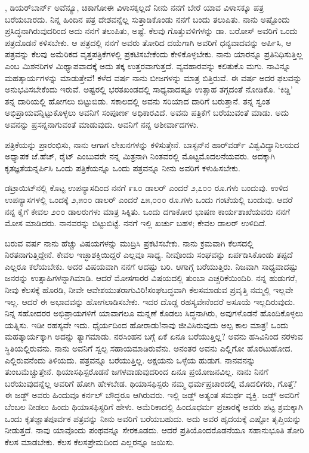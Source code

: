 , ಡಿಯರ್‌ಬಾರ್ನ್ ಅವೆನ್ಯೂ, ಚಿಕಾಗೋ\enginline{-}ಈ ವಿಳಾಸಕ್ಕಲ್ಲದೆ ನೀನು ನನಗೆ ಬೇರೆ ಯಾವ ವಿಳಾಸಕ್ಕೂ ಪತ್ರ ಬರೆಯಬಾರದು. ನಿನ್ನ ಹಿಂದಿನ ಪತ್ರ ದೇಶವನ್ನೆಲ್ಲ ಸುತ್ತಾಡಿಕೊಂಡು ನನಗೆ ಬಂದು ತಲುಪಿತು. ನಾನು ಅಷ್ಟೊಂದು ಪ್ರಸಿದ್ಧನಾಗಿರುವುದರಿಂದ ಅದು ನನಗೆ ತಲುಪಿತು, ಅಷ್ಟೆ. ಕೆಲವು ಗೊತ್ತುವಳಿಗಳನ್ನು ಡಾ. ಬರೋಸ್ ಅವರಿಗೆ ಒಂದು ಪತ್ರದೊಡನೆ ಕಳಿಸಬೇಕು. ಆ ಪತ್ರದಲ್ಲಿ ನನಗೆ ಅವರು ತೋರಿದ ದಯೆಗಾಗಿ ಅವರಿಗೆ ಧನ್ಯವಾದವನ್ನು ಅರ್ಪಿಸಿ, ಆ ಪತ್ರವನ್ನು ಕೆಲವು ಅಮೆರಿಕದ ವೃತ್ತಪತ್ರಿಕೆಗಳಲ್ಲಿ ಪ್ರಕಟಿಸಬೇಕೆಂದು ಕೇಳಿಕೊಳ್ಳಬೇಕು. ನಾನು ಯಾರನ್ನೂ ಪ್ರತಿನಿಧಿಸುತ್ತಿಲ್ಲ ಎಂಬ ಮಿಶನರಿಗಳ ಮಿಥ್ಯಾಪವಾದಕ್ಕೆ ಅದು ತಕ್ಕ ಉತ್ತರವಾಗುತ್ತದೆ. ವ್ಯವಹಾರವನ್ನು ಕಲಿತುಕೊ ಮಗು. ನಾವಿನ್ನೂ ಮಹತ್ಕಾರ್ಯಗಳನ್ನು ಮಾಡುತ್ತೇವೆ! ಕಳೆದ ವರ್ಷ ನಾನು ಬೀಜಗಳನ್ನು ಮಾತ್ರ ಬಿತ್ತಿರುವೆ. ಈ ವರ್ಷ ಅದರ ಫಲವನ್ನು ಅನುಭವಿಸಬೇಕೆಂದು ಇರುವೆ. ಅಷ್ಟರಲ್ಲಿ ಭರತಖಂಡದಲ್ಲಿ ಸಾಧ್ಯವಾದಷ್ಟೂ ಉತ್ಸಾಹ ತಗ್ಗದಂತೆ ನೋಡಿಕೊ. `ಕಿಡ್ಡಿ' ತನ್ನ ದಾರಿಯಲ್ಲಿ ಹೋಗಲು ಬಿಟ್ಟುಬಿಡು. ಸಕಾಲದಲ್ಲಿ ಅವನು ಸರಿಯಾದ ದಾರಿಗೆ ಬರುತ್ತಾನೆ. ತನ್ನ ಸ್ವಂತ ಅಭಿಪ್ರಾಯವನ್ನಿಟ್ಟುಕೊಳ್ಳಲು ಅವನಿಗೆ ಸಂಪೂರ್ಣ ಅಧಿಕಾರವಿದೆ. ಅವನು ಪತ್ರಿಕೆಗೆ ಬರೆಯುವಂತೆ ಮಾಡು. ಅದು ಅವನನ್ನು ಪ್ರಸನ್ನನಾಗುವಂತೆ ಮಾಡುವುದು. ಅವನಿಗೆ ನನ್ನ ಆಶೀರ್ವಾದಗಳು.

ಪತ್ರಿಕೆಯನ್ನು ಪ್ರಾರಂಭಿಸು, ನಾನು ಆಗಾಗ ಲೇಖನಗಳನ್ನು ಕಳಿಸುತ್ತೇನೆ. ಬಾಸ್ಟನ್‌ನ ಹಾರ್‌ವರ್ಡ್ ವಿಶ್ವವಿದ್ಯಾನಿಲಯದ ಅಧ್ಯಾಪಕ ಜೆ.ಹೆಚ್, ರೈಟ್ ಎಂಬುವರೇ ನನ್ನ ಮಿತ್ರನಾಗಿ ನಿಂತವರಲ್ಲಿ ಮೊಟ್ಟಮೊದಲನೆಯವರು. ಅದಕ್ಕಾಗಿ ಕೃತಜ್ಞತೆಯನ್ನರ್ಪಿಸಿ ಒಂದು ಪತ್ರಿಕೆಯನ್ನೂ ಒಂದು ಪತ್ರವನ್ನೂ ನೀನು ಅವರಿಗೆ ಕಳುಹಿಸಬೇಕು.

ಡಟ್ರಾಯಿಟ್‌ನಲ್ಲಿ ಕೊಟ್ಟ ಉಪನ್ಯಾಸದಿಂದ ನನಗೆ ೯೩೦ ಡಾಲರ್ ಎಂದರೆ ೨,೭೦೦ ರೂ.ಗಳು ಬಂದುವು. ಉಳಿದ ಉಪನ್ಯಾಸಗಳಲ್ಲಿ ಒಂದಕ್ಕೆ ೨,೫೦೦ ಡಾಲರ್ ಎಂದರೆ ೭೫,೦೦೦ ರೂ.ಗಳು ಒಂದು ಗಂಟೆಯಲ್ಲಿ ಬಂದುವು. ಆದರೆ ನನ್ನ ಕೈಗೆ ಕೇವಲ ೨೦೦ ಡಾಲರುಗಳು ಮಾತ್ರ ಸಿಕ್ಕಿತು. ಒಂದು ದಗಾಕೋರ ಭಾಷಣ ಕಾರ್ಯಶಾಖೆಯವರು ನನಗೆ ಮೋಸ ಮಾಡಿದರು. ನಾನವರನ್ನು ಬಿಟ್ಟುಬಿಟ್ಟೆ. ನನಗೆ ಇಲ್ಲಿ ಖರ್ಚು ಬಹಳ; ಕೇವಲ  ಡಾಲರ್‌ ಉಳಿದಿದೆ.

ಬರುವ ವರ್ಷ ನಾನು ಹೆಚ್ಚು ವಿಷಯಗಳನ್ನು ಮುದ್ರಿಸಿ ಪ್ರಕಟಿಸಬೇಕು. ನಾನು ಕ್ರಮವಾಗಿ ಕೆಲಸದಲ್ಲಿ ನಿರತನಾಗುತ್ತಿದ್ದೇನೆ. ಕೇವಲ ಇಚ್ಛಾಶಕ್ತಿಯಿದ್ದರೆ ಎಲ್ಲವೂ ಸಾಧ್ಯ. ನೀವೊಂದು ಸಂಘವನ್ನು ಏರ್ಪಡಿಸಿಕೊಂಡು ತಪ್ಪದೆ ಎಲ್ಲರೂ ಕಲೆಯಬೇಕು. ಅದರ ವಿಷಯವಾಗಿ ನನಗೆ ಆದಷ್ಟು ಬರಿ. ಆಗಾಗ್ಗೆ ಬರೆಯುತ್ತಿರು. ನಿಜವಾಗಿ ಸಾಧ್ಯವಾದಷ್ಟು ಜನರನ್ನು ಉತ್ಸಾಹಿಗಳನ್ನಾಗಿಮಾಡಿ. ಆದರೆ ಮೋಸಗಾರರ ವಿಷಯದಲ್ಲಿ ತುಂಬಾ ಎಚ್ಚರಿಕೆಯಿಂದಿರಿ. ನನ್ನ ಹುಡುಗರೆ, ನೀವು ಕೆಲಸಕ್ಕೆ ಹೊರಡಿ, ನೀವೇ ಆವೇಶಯುತರಾಗುವಿರಿ!ಸಂಘಬದ್ಧವಾಗಿ ಕೆಲಸಮಾಡುವ ಪ್ರವೃತ್ತಿ ನಮ್ಮಲ್ಲಿ ಇಲ್ಲವೇ ಇಲ್ಲ. ಆದರೆ ಈ ಅಭಾವವನ್ನು ಹೋಗಲಾಡಿಸಬೇಕು. ಇದರ ದೊಡ್ಡ ರಹಸ್ಯವೇನೆಂದರೆ ಅಸೂಯೆ ಇಲ್ಲದಿರುವುದು. ನಿನ್ನ ಸಹೋದರರ ಅಭಿಪ್ರಾಯಗಳಿಗೆ ಯಾವಾಗಲೂ ಮನ್ನಣೆ ಕೊಡಲು ಸಿದ್ಧನಾಗಿರು, ಅವುಗಳೊಡನೆ ಹೊಂದಿಕೊಳ್ಳಲು ಯತ್ನಿಸು. ಇಡೀ ರಹಸ್ಯವೇ ಇದು. ಧೈರ್ಯದಿಂದ ಹೋರಾಡು!ನಾವು ಜೀವಿಸಿರುವುದು ಅಲ್ಪ ಕಾಲ ಮಾತ್ರ! ಒಂದು ಮಹತ್ಕಾರ್ಯಕ್ಕಾಗಿ ಅದನ್ನು ತ್ಯಾಗಮಾಡು. ನರಸಿಂಹನ ಬಗ್ಗೆ ಏಕೆ ಏನೂ ಬರೆಯುತ್ತಿಲ್ಲ? ಅವನು ಹಸಿವಿನಿಂದ ನರಳುವ ಸ್ಥಿತಿಯಲ್ಲಿರುವನು. ನಾನು ಅವನಿಗೆ ಸ್ವಲ್ಪ ಸಹಾಯಮಾಡಿರುವೆನು. ಅನಂತರ ಅವನು ಎಲ್ಲಿಗೋ ಹೊರಟುಹೋದ. ಎಲ್ಲಿರುವನೆಂದು ತಿಳಿಯದು. ಪತ್ರವನ್ನೂ ಬರೆಯುತ್ತಿಲ್ಲ. ಅಕ್ಷಯನು ಒಳ್ಳೆಯ ಹುಡುಗ. ನಾನವನನ್ನು ತುಂಬಮೆಚ್ಚುತ್ತೇನೆ. ಥಿಯಾಸಫಿಸ್ಟರೊಡನೆ ಜಗಳವಾಡುವುದರಿಂದ ಏನೂ ಪ್ರಯೋಜನವಿಲ್ಲ. ನಾನು ನಿನಗೆ ಬರೆಯುವುದನ್ನೆಲ್ಲ ಅವರಿಗೆ ಹೋಗಿ ಹೇಳಬೇಡ. ಥಿಯಾಸಫಿಸ್ಟರು ನಮ್ಮ ಧರ್ಮಪ್ರಚಾರದಲ್ಲಿ ಮೊದಲಿಗರು, ಗೊತ್ತೆ? ಈ ಜಡ್ಜ್ ಅವರು ಹಿಂದುವೂ ಕರ್ನಲ್ ಬೌದ್ಧರೂ ಆಗಿರುವರು. ಇಲ್ಲಿ ಜಡ್ಜ್ ಅತ್ಯಂತ ಸಮರ್ಥ ವ್ಯಕ್ತಿ. ಜಡ್ಜ್ ಅವರಿಗೆ ಬೆಂಬಲ ನೀಡಲು ಹಿಂದು ಥಿಯಾಸಫಿಸ್ಟರಿಗೆ ಹೇಳು. ಅಮೆರಿಕಾದಲ್ಲಿ ಹಿಂದೂಧರ್ಮ ಪ್ರಚಾರಕ್ಕೆ ಅವರು ಪಟ್ಟ ಶ್ರಮಕ್ಕಾಗಿ ಒಂದು ಕೃತಜ್ಞಾತಪೂರ್ವಕ ಪತ್ರವನ್ನು ನೀನು ಅವರಿಗೆ ಬರೆಯಬಹುದು. ಅದು ಅವರ ಹೃದಯಕ್ಕೆ ಎಷ್ಟೋ ತೃಪ್ತಿಯನ್ನು ನೀಡುತ್ತದೆ. ನಾವು ಯಾವೊಂದು ಪಂಥವನ್ನೂ ಸೇರಕೂಡದು. ಆದರೆ ಪ್ರತಿಯೊಂದರೊಡನೆಯೂ ಸಹಾನುಭೂತಿ ತೋರಿ ಕೆಲಸ ಮಾಡಬೇಕು. ಕೆಲಸ ಕೆಲಸ\enginline{-}ಪ್ರೇಮದಿಂದ ಎಲ್ಲರನ್ನೂ ಜಯಿಸು.

